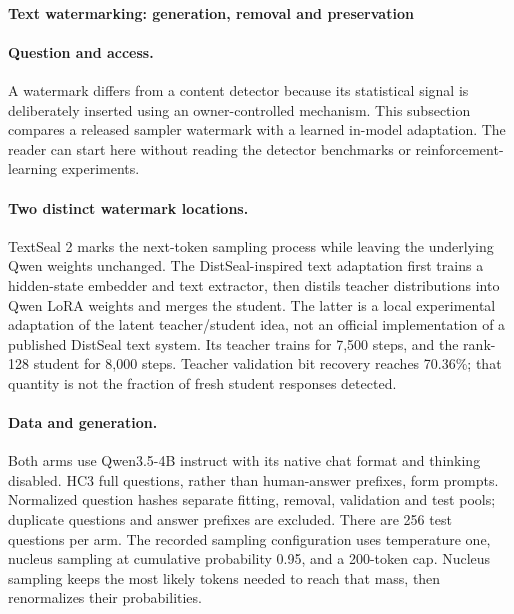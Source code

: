 \paragraph{Text watermarking: generation, removal and preservation}
\label{sec:text_watermarks}
\paragraph{Question and access.} A watermark differs from a content detector because its statistical signal is deliberately inserted using an owner-controlled mechanism. This subsection compares a released sampler watermark with a learned in-model adaptation. The reader can start here without reading the detector benchmarks or reinforcement-learning experiments.

\paragraph{Two distinct watermark locations.} TextSeal 2 marks the next-token sampling process while leaving the underlying Qwen weights unchanged. The DistSeal-inspired text adaptation first trains a hidden-state embedder and text extractor, then distils teacher distributions into Qwen LoRA weights and merges the student. The latter is a local experimental adaptation of the latent teacher/student idea, not an official implementation of a published DistSeal text system. Its teacher trains for 7,500 steps, and the rank-128 student for 8,000 steps. Teacher validation bit recovery reaches 70.36\%; that quantity is not the fraction of fresh student responses detected.

\paragraph{Data and generation.} Both arms use Qwen3.5-4B instruct with its native chat format and thinking disabled. HC3 full questions, rather than human-answer prefixes, form prompts. Normalized question hashes separate fitting, removal, validation and test pools; duplicate questions and answer prefixes are excluded. There are 256 test questions per arm. The recorded sampling configuration uses temperature one, nucleus sampling at cumulative probability 0.95, and a 200-token cap. Nucleus sampling keeps the most likely tokens needed to reach that mass, then renormalizes their probabilities.

